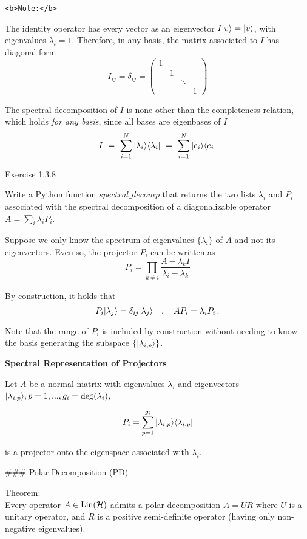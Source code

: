 \documentclass[11pt]{article}
\begin{document}
    \begin{verbatim}
<b>Note:</b>
\end{verbatim}

The identity operator has every vector as an eigenvector
\(I|v\rangle = |v\rangle\), with eigenvalues \(\lambda_i = 1\). Therefore,
in any basis, the matrix associated to \(I\) has diagonal form \[
I_{ij} = \delta_{ij} = \begin{pmatrix} 1 &  &  &  \\ & 1 & &  \\ & & \ddots & \\ & & &  1 \end{pmatrix}
\]

The spectral decomposition of \(I\) is none other than the completeness
relation, which holds \emph{for any basis}, since all bases are
eigenbases of \(I\) \[
I ~=~ \sum_{i=1}^N | \lambda_i\rangle \langle \lambda_i| ~=~ \sum_{i=1}^N | e_i\rangle \langle e_i|
\]

    Exercise 1.3.8

Write a Python function \(spectral\_decomp\) that returns the two lists
\(\lambda_i\) and \(P_i\) associated with the spectral decomposition of
a diagonalizable operator \(A = \sum_i \lambda_i P_i\).

    Suppose we only know the spectrum of eigenvalues \(\{\lambda_i\}\) of
\(A\) and not its eigenvectors. Even so, the projector \(P_i\) can be
written as \[
P_i = \prod_{k \neq i} \frac{A - \lambda_k I}{\lambda_i - \lambda_k}
\]

    By construction, it holds that \[
P_i |\lambda_j\rangle = \delta_{ij} |\lambda_j\rangle \quad , \quad AP_i = \lambda_i P_i \, .
\]

Note that the range of \(P_i\) is included by construction without
needing to know the basis generating the subspace
\(\{|\lambda_{i,p}\rangle\}\).

    \textbf{Spectral Representation of Projectors}

Let \(A\) be a normal matrix with eigenvalues \(\lambda_i\) and
eigenvectors
\(|\lambda_{i,p}\rangle, p=1,...,g_i = \mathrm{deg}(\lambda_i)\),

\[
P_i = \sum_{p=1}^{g_i} |\lambda_{i,p}\rangle\langle \lambda_{i,p}| 
\]

is a projector onto the eigenspace associated with \(\lambda_i\).

    \#\#\# Polar Decomposition (PD)

Theorem: \\
Every operator \(A \in \hbox{Lin}({\cal H})\) admits a polar decomposition
\(A = U R\) where \(U\) is a unitary operator, and \(R\) is a positive
semi-definite operator (having only non-negative eigenvalues).
\end{document}

